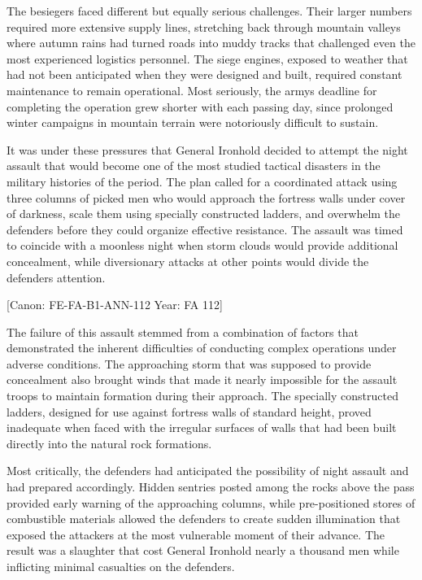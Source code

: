 The besiegers faced different but equally serious challenges. Their
larger numbers required more extensive supply lines, stretching back
through mountain valleys where autumn rains had turned roads into muddy
tracks that challenged even the most experienced logistics personnel.
The siege engines, exposed to weather that had not been anticipated when
they were designed and built, required constant maintenance to remain
operational. Most seriously, the army\textquotesingle s deadline for
completing the operation grew shorter with each passing day, since
prolonged winter campaigns in mountain terrain were notoriously
difficult to sustain.

It was under these pressures that General Ironhold decided to attempt
the night assault that would become one of the most studied tactical
disasters in the military histories of the period. The plan called for a
coordinated attack using three columns of picked men who would approach
the fortress walls under cover of darkness, scale them using specially
constructed ladders, and overwhelm the defenders before they could
organize effective resistance. The assault was timed to coincide with a
moonless night when storm clouds would provide additional concealment,
while diversionary attacks at other points would divide the
defenders\textquotesingle{} attention.

{[}Canon: FE-FA-B1-ANN-112 \textbar{} Year: FA 112{]}

The failure of this assault stemmed from a combination of factors that
demonstrated the inherent difficulties of conducting complex operations
under adverse conditions. The approaching storm that was supposed to
provide concealment also brought winds that made it nearly impossible
for the assault troops to maintain formation during their approach. The
specially constructed ladders, designed for use against fortress walls
of standard height, proved inadequate when faced with the irregular
surfaces of walls that had been built directly into the natural rock
formations.

Most critically, the defenders had anticipated the possibility of night
assault and had prepared accordingly. Hidden sentries posted among the
rocks above the pass provided early warning of the approaching columns,
while pre-positioned stores of combustible materials allowed the
defenders to create sudden illumination that exposed the attackers at
the most vulnerable moment of their advance. The result was a slaughter
that cost General Ironhold nearly a thousand men while inflicting
minimal casualties on the defenders.

